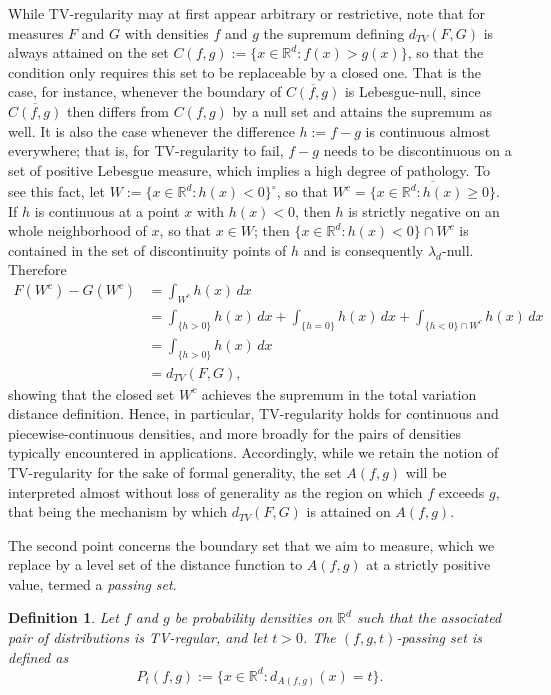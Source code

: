 \documentclass[12pt]{article}
\newtheorem{definition}{Definition}
\newcommand{\RR}{\mathbb{R}}
\begin{document}
While TV-regularity may at first appear arbitrary or restrictive, note that for measures
$F$ and $G$ with densities $f$ and $g$ the supremum defining $d_{TV}(F,G)$ is always attained on the set
$C(f,g):=\{x \in \RR^d : f(x) > g(x)\}$, so that the condition only requires this set to be replaceable by
a closed one. That is the case, for instance, whenever the boundary of
$\overline{C(f,g)}$ is Lebesgue-null, since $\overline{C(f,g)}$ then differs from $C(f,g)$
by a null set and attains the supremum as well. It is also the case whenever the
difference $h := f-g$ is continuous almost everywhere; that is, for TV-regularity to fail, $f-g$ needs to be discontinuous on a set of positive Lebesgue measure, which implies a high degree of pathology. To see this fact, let $W:=\{x\in\mathbb R^d : h(x)<0\}^\circ$, so that $W^c=\overline{\{x\in\mathbb R^d : h(x)\geq0\}}$. If
$h$ is continuous at a point $x$ with $h(x)<0$, then $h$ is strictly negative on an whole neighborhood of
$x$, so that $x\in W$; then $\{x\in\mathbb R^d : h(x)<0\}\cap W^c$ is contained in the
set of discontinuity points of $h$ and is consequently $\lambda_d$-null. Therefore
%
\begin{align*}
F(W^c)-G(W^c) & =\int_{W^c} h(x)\,dx\\
&=\int_{\{h>0\}} h(x)\,dx+ \int_{\{h=0\}} h(x)\,dx + \int_{\{h<0\}\cap W^c} h(x)\,dx
\\
&=\int_{\{h>0\}} h(x)\,dx \\
& = d_{TV}(F,G),
\end{align*}
%
showing that the closed set $W^c$ achieves the supremum in the total variation distance definition. Hence, in particular, TV-regularity
holds for continuous and piecewise-continuous densities, and more broadly for the pairs of
densities typically encountered in applications. Accordingly, while we retain the notion of
TV-regularity for the sake of formal generality, the set $A(f,g)$ will be interpreted almost without loss of generality as the region on which $f$ exceeds
$g$, that being the mechanism by which $d_{TV}(F,G)$ is attained on $A(f,g)$.

The second point concerns the boundary set that we aim to measure, which we replace by a level set of the
distance function to $A(f,g)$ at a strictly positive value, termed a \emph{passing set}.

\begin{definition}\label{def:passing_set}
Let $f$ and $g$ be probability densities on $\RR^d$ such that the associated pair of
distributions is TV-regular, and let $t>0$. The \emph{$(f,g,t)$-passing set} is defined as
%
\begin{equation*}
P_t(f,g) := \{x\in\RR^d : d_{A(f,g)}(x) = t\}.
\end{equation*}
\end{definition}
\end{document}
